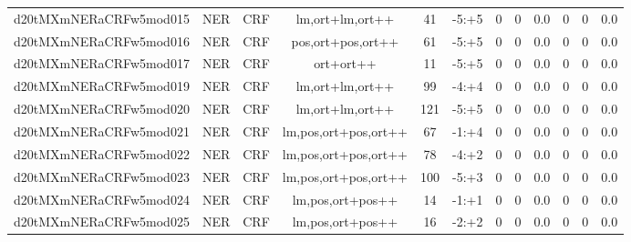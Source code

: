 \documentclass[a4paper]{article}
\begin{document}
\begin{landscape}
\begin{center}
\begin{tabular}{ |c|c|c|c|c|c|c|c|c|c|c|c|}
 
 	
 	\small{ d20tMXmNERaCRFw5mod015 } & \small{ NER} & \small{  CRF }  & lm,ort+lm,ort++  &  41 &  \small{  -5:+5 }  &  0 & 0 & 0.0  &  0 & 0 & 0.0 \\
 	

 
 	
 	\small{ d20tMXmNERaCRFw5mod016 } & \small{ NER} & \small{  CRF }  & pos,ort+pos,ort++  &  61 &  \small{  -5:+5 }  &  0 & 0 & 0.0  &  0 & 0 & 0.0 \\
 	

 
 	
 	\small{ d20tMXmNERaCRFw5mod017 } & \small{ NER} & \small{  CRF }  & ort+ort++  &  11 &  \small{  -5:+5 }  &  0 & 0 & 0.0  &  0 & 0 & 0.0 \\
 	

 
 	
 	\small{ d20tMXmNERaCRFw5mod019 } & \small{ NER} & \small{  CRF }  & lm,ort+lm,ort++  &  99 &  \small{  -4:+4 }  &  0 & 0 & 0.0  &  0 & 0 & 0.0 \\
 	

 
 	
 	\small{ d20tMXmNERaCRFw5mod020 } & \small{ NER} & \small{  CRF }  & lm,ort+lm,ort++  &  121 &  \small{  -5:+5 }  &  0 & 0 & 0.0  &  0 & 0 & 0.0 \\
 	

 
 	
 	\small{ d20tMXmNERaCRFw5mod021 } & \small{ NER} & \small{  CRF }  & lm,pos,ort+pos,ort++  &  67 &  \small{  -1:+4 }  &  0 & 0 & 0.0  &  0 & 0 & 0.0 \\
 	

 
 	
 	\small{ d20tMXmNERaCRFw5mod022 } & \small{ NER} & \small{  CRF }  & lm,pos,ort+pos,ort++  &  78 &  \small{  -4:+2 }  &  0 & 0 & 0.0  &  0 & 0 & 0.0 \\
 	

 
 	
 	\small{ d20tMXmNERaCRFw5mod023 } & \small{ NER} & \small{  CRF }  & lm,pos,ort+pos,ort++  &  100 &  \small{  -5:+3 }  &  0 & 0 & 0.0  &  0 & 0 & 0.0 \\
 	

 
 	
 	\small{ d20tMXmNERaCRFw5mod024 } & \small{ NER} & \small{  CRF }  & lm,pos,ort+pos++  &  14 &  \small{  -1:+1 }  &  0 & 0 & 0.0  &  0 & 0 & 0.0 \\
 	

 
 	
 	\small{ d20tMXmNERaCRFw5mod025 } & \small{ NER} & \small{  CRF }  & lm,pos,ort+pos++  &  16 &  \small{  -2:+2 }  &  0 & 0 & 0.0  &  0 & 0 & 0.0 \\
 	


\end{tabular}
\end{center}
\end{landscape}
\end{document}
